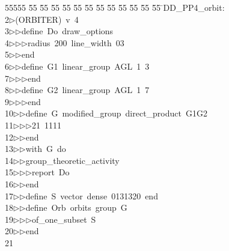 %
%
\begin{tabbing}
55555 \= 55 \= 55 \= 55 \= 55 \= 55 \= 55 \= 55 \= 55 \= 55 \= 55 \= 55 \= 55 \= \>DD\_PP4\_orbit:\\[0pt]
2\>$\triangleright$\>(ORBITER)\ v\ 4\ \\[0pt]
3\>$\triangleright$\>$\triangleright$\>define\ Do\ draw\_options\ \\[0pt]
4\>$\triangleright$\>$\triangleright$\>$\triangleright$\>radius\ 200\ line\_width\ 03\ \\[0pt]
5\>$\triangleright$\>$\triangleright$\>end\ \\[0pt]
6\>$\triangleright$\>$\triangleright$\>define\ G1\ linear\_group\ AGL\ 1\ 3\ \\[0pt]
7\>$\triangleright$\>$\triangleright$\>$\triangleright$\>end\ \\[0pt]
8\>$\triangleright$\>$\triangleright$\>define\ G2\ linear\_group\ AGL\ 1\ 7\ \\[0pt]
9\>$\triangleright$\>$\triangleright$\>$\triangleright$\>end\ \\[0pt]
10\>$\triangleright$\>$\triangleright$\>define\ G\ modified\_group\ direct\_product\ G1G2\ \\[0pt]
11\>$\triangleright$\>$\triangleright$\>$\triangleright$\>21\ 1111\ \\[0pt]
12\>$\triangleright$\>$\triangleright$\>end\ \\[0pt]
13\>$\triangleright$\>$\triangleright$\>with\ G\ do\ \\[0pt]
14\>$\triangleright$\>$\triangleright$\>group\_theoretic\_activity\ \\[0pt]
15\>$\triangleright$\>$\triangleright$\>$\triangleright$\>report\ Do\ \\[0pt]
16\>$\triangleright$\>$\triangleright$\>end\ \\[0pt]
17\>$\triangleright$\>$\triangleright$\>define\ S\ vector\ dense\ 0131320\ end\ \\[0pt]
18\>$\triangleright$\>$\triangleright$\>define\ Orb\ orbits\ group\ G\ \\[0pt]
19\>$\triangleright$\>$\triangleright$\>$\triangleright$\>of\_one\_subset\ S\ \\[0pt]
20\>$\triangleright$\>$\triangleright$\>end\\[0pt]
21\>\end{tabbing}
